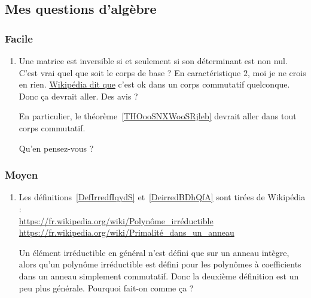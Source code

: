 \subsection{Mes questions d'algèbre}

\subsubsection{Facile}

\begin{enumerate}
    \item       \label{ITEMooWIFJooZBzbiu}
        Une matrice est inversible si et seulement si son déterminant est non nul. C'est vrai quel que soit le corps de base ? En caractéristique \( 2\), moi je ne crois en rien. \href{https://fr.wikipedia.org/wiki/Matrice_inversible}{Wikipédia dit que} c'est ok dans un corps commutatif quelconque. Donc ça devrait aller. Des avis ?

        En particulier, le théorème~\ref{THOooSNXWooSRjleb} devrait aller dans tout corps commutatif.

        Qu'en pensez-vous ?
\end{enumerate}

\subsubsection{Moyen}

\begin{enumerate}
    \item
        Les définitions~\ref{DefIrredfIqydS} et~\ref{DeirredBDhQfA} sont tirées de Wikipédia :\\
        \url{https://fr.wikipedia.org/wiki/Polynôme_irréductible}\\
        \url{https://fr.wikipedia.org/wiki/Primalité_dans_un_anneau}

        Un élément irréductible en général n'est défini que sur un anneau intègre, alors qu'un polynôme irréductible est défini pour les polynômes à coefficients dans un anneau simplement commutatif. Donc la deuxième définition est un peu plus générale. Pourquoi fait-on comme ça ?
\end{enumerate}

